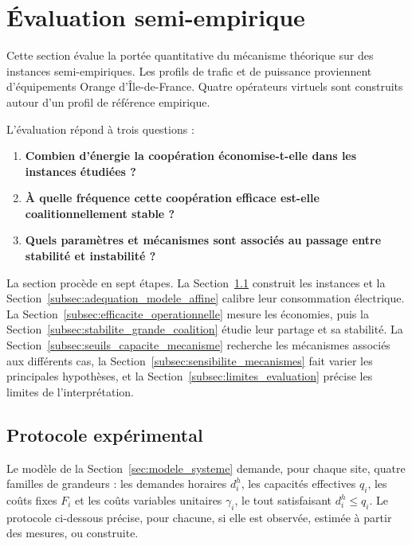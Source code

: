 \section{Évaluation semi-empirique}
\label{sec:simulations_numeriques}

Cette section évalue la portée quantitative du mécanisme théorique sur des
instances semi-empiriques. Les profils de trafic et de puissance proviennent
d'équipements Orange d'Île-de-France. Quatre opérateurs virtuels sont
construits autour d'un profil de référence empirique.

L'évaluation répond à trois questions :
\begin{enumerate}
    \item \textbf{Combien d'énergie la coopération économise-t-elle dans les
    instances étudiées ?}
    \item \textbf{À quelle fréquence cette coopération efficace est-elle
    coalitionnellement stable ?}
    \item \textbf{Quels paramètres et mécanismes sont associés au passage
    entre stabilité et instabilité ?}
\end{enumerate}

La section procède en sept étapes. La Section~\ref{subsec:protocole_experimental}
construit les instances et la Section~\ref{subsec:adequation_modele_affine}
calibre leur consommation électrique. La
Section~\ref{subsec:efficacite_operationnelle} mesure les économies, puis la
Section~\ref{subsec:stabilite_grande_coalition} étudie leur partage et sa
stabilité. La Section~\ref{subsec:seuils_capacite_mecanisme} recherche les
mécanismes associés aux différents cas, la
Section~\ref{subsec:sensibilite_mecanismes} fait varier les principales
hypothèses, et la Section~\ref{subsec:limites_evaluation} précise les limites
de l'interprétation.

\subsection{Protocole expérimental}
\label{subsec:protocole_experimental}

Le modèle de la Section~\ref{sec:modele_systeme} demande, pour chaque site,
quatre familles de grandeurs : les demandes horaires \(d_i^h\), les capacités
effectives \(q_i\), les coûts fixes \(F_i\) et les coûts variables unitaires
\(\gamma_i\), le tout satisfaisant \(d_i^h\leqslant q_i\). Le protocole
ci-dessous précise, pour chacune, si elle est observée, estimée à partir des
mesures, ou construite.


